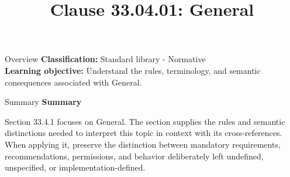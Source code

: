 \documentclass[10pt,letterpaper]{article}
\title{Clause 33.04.01: General}
\author{}
\date{}
\begin{document}
\maketitle
\begin{CornellOverviewBox}{Overview}
\textbf{Classification:} Standard library - Normative\\[2pt]
\textbf{Learning objective:} Understand the rules, terminology, and semantic consequences associated with General.
\end{CornellOverviewBox}\begin{CornellSummaryBox}{Summary}
{\sffamily\bfseries\color{Accent} Summary}\par\vspace{3pt}Section 33.4.1 focuses on General. The section supplies the rules and semantic distinctions needed to interpret this topic in context with its cross-references. When applying it, preserve the distinction between mandatory requirements, recommendations, permissions, and behavior deliberately left undefined, unspecified, or implementation-defined.
\end{CornellSummaryBox}
\end{document}
